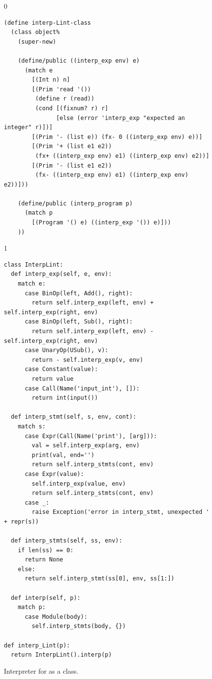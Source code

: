 \documentclass[7x10]{TimesAPriori_MIT}%
\def\racketEd{0}
\def\pythonEd{1}
\def\edition{1}
\newcommand{\pythonColor}[0]{}
\numberwithin{theorem}{chapter}
\numberwithin{definition}{chapter}
\numberwithin{equation}{chapter}
\begin{document}
\begin{figure}[tp]
\begin{tcolorbox}[colback=white]
{\if\edition\racketEd
\begin{lstlisting}
(define interp-Lint-class
  (class object%
    (super-new)
    
    (define/public ((interp_exp env) e)
      (match e
        [(Int n) n]
        [(Prim 'read '())
         (define r (read))
         (cond [(fixnum? r) r]
               [else (error 'interp_exp "expected an integer" r)])]
        [(Prim '- (list e)) (fx- 0 ((interp_exp env) e))]
        [(Prim '+ (list e1 e2))
         (fx+ ((interp_exp env) e1) ((interp_exp env) e2))]
        [(Prim '- (list e1 e2))
         (fx- ((interp_exp env) e1) ((interp_exp env) e2))]))

    (define/public (interp_program p)
      (match p
        [(Program '() e) ((interp_exp '()) e)]))
    ))
\end{lstlisting}
\fi}
{\if\edition\pythonEd\pythonColor
\begin{lstlisting}
class InterpLint:
  def interp_exp(self, e, env):
    match e:
      case BinOp(left, Add(), right):
        return self.interp_exp(left, env) + self.interp_exp(right, env)
      case BinOp(left, Sub(), right):
        return self.interp_exp(left, env) - self.interp_exp(right, env)
      case UnaryOp(USub(), v):
        return - self.interp_exp(v, env)
      case Constant(value):
        return value
      case Call(Name('input_int'), []):
        return int(input())            

  def interp_stmt(self, s, env, cont):
    match s:
      case Expr(Call(Name('print'), [arg])):
        val = self.interp_exp(arg, env)
        print(val, end='')
        return self.interp_stmts(cont, env)
      case Expr(value):
        self.interp_exp(value, env)
        return self.interp_stmts(cont, env)
      case _:
        raise Exception('error in interp_stmt, unexpected ' + repr(s))
    
  def interp_stmts(self, ss, env):
    if len(ss) == 0:
      return None
    else:
      return self.interp_stmt(ss[0], env, ss[1:])

  def interp(self, p):
    match p:
      case Module(body):
        self.interp_stmts(body, {})

def interp_Lint(p):
  return InterpLint().interp(p)
\end{lstlisting}
\fi}
\end{tcolorbox}
\caption{Interpreter for \LangInt{} as a class.}
\label{fig:interp-Lint-class}
\end{figure}
\end{document}
